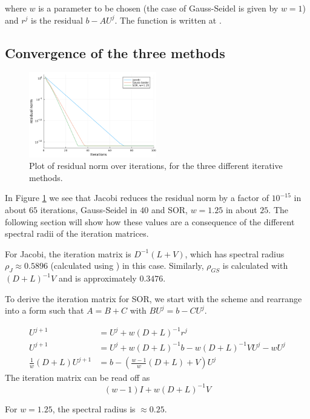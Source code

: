 \documentclass{article}
\numberwithin{equation}{section}
\theoremstyle{definition}
\begin{document}
where $w$ is a parameter to be chosen (the case of Gauss-Seidel is given by $w=1$) and $r^j$ is the residual $b - AU^j$.
The function is written at .

\subsection{Convergence of the three methods}
\begin{figure}[H]
    \centering
    \includegraphics[width=0.496\textwidth]{fig1.png}
    \caption{Plot of residual norm over iterations, for the three different iterative methods.}
    \label{fig:afig_1}
\end{figure}
In Figure \ref{fig:afig_1} we see that Jacobi reduces the residual norm by a factor of $10^{-15}$ in about $65$ iterations, Gauss-Seidel in $40$ and SOR, $w=1.25$ in about $25$. The following section will show how these values are a consequence of the different spectral radii of the iteration matrices.

For Jacobi, the iteration matrix is $D^{-1}(L+V)$, which has spectral radius $\rho_J \approx 0.5896$ (calculated using ) in this case. Similarly, $\rho_{GS}$ is calculated with $(D+L)^{-1}V$ and is approximately $0.3476$.

To derive the iteration matrix for SOR, we start with the scheme and rearrange into a form such that $A = B+C$ with $BU^j = b - CU^j$.

\begin{align}
    U^{j+1} &= U^j + w(D+L)^{-1}r^j \\
    U^{j+1} &= U^j + w(D+L)^{-1}b - w(D+L)^{-1}VU^j-w U^j\\
    \frac 1w (D+L)U^{j+1} &= b - \left(\frac{w-1}{w}(D+L) + V\right)U^j
\end{align}
The iteration matrix can be read off as
\begin{equation}
    \label{eq:sor_it_mat}
    (w-1)I + w(D+L)^{-1}V
\end{equation}

For $w=1.25$, the spectral radius is $\approx 0.25$.
\end{document}
